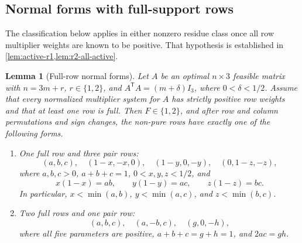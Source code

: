 \documentclass[11pt]{article}
\numberwithin{equation}{section}
\newtheorem{lemma}[lemma]{Lemma}
\theoremstyle{definition}
\theoremstyle{definition}
\begin{document}
\subsection{Normal forms with full-support rows}
The classification below applies in either nonzero residue class once
all row multiplier weights are known to be positive. That hypothesis
is established in \cref{lem:active-r1,lem:r2-all-active}.

\begin{lemma}[Full-row normal forms]
\label{lem:full-row-classification}
Let $A$ be an optimal $n\times3$ feasible matrix with
$n=3m+r$, $r\in\{1,2\}$, and
$A^{\mathsf T}A=(m+\delta)I_3$, where $0<\delta<1/2$.
Assume that every normalized multiplier system for $A$ has strictly
positive row weights and that at least one row is full.  Then
$F\in\{1,2\}$, and after row and column permutations and sign changes,
the non-pure rows have exactly one of the following forms.
\begin{enumerate}
\item One full row and three pair rows:
\begin{equation}
 (a,b,c),\quad(1-x,-x,0),\quad(1-y,0,-y),\quad(0,1-z,-z),
 \label{eq:one-full-form}
\end{equation}
where $a,b,c>0$, $a+b+c=1$, $0<x,y,z<1/2$, and
\[
 x(1-x)=ab,\qquad y(1-y)=ac,\qquad z(1-z)=bc.
\]
In particular, $x<\min(a,b)$, $y<\min(a,c)$, and
$z<\min(b,c)$.
\item Two full rows and one pair row:
\begin{equation}
 (a,b,c),\quad(a,-b,c),\quad(g,0,-h),
 \label{eq:two-full-form}
\end{equation}
where all five parameters are positive,
$a+b+c=g+h=1$, and $2ac=gh$.
\end{enumerate}
\end{lemma}
\end{document}
